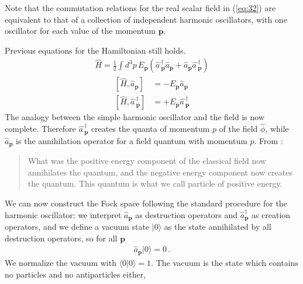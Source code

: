 Note that the commutation relations for the real scalar field in (\ref{eq:32}) are equivalent to that of a collection of independent harmonic oscillators, with one oscillator for each value of the momentum $\mathbf{p}$.

Previous equations for the Hamiltonian still holds. 
\begin{align}
  \widehat{H}=\frac{1}{2}\int d^3p\,E_{\mathbf{p}}\left(\widehat{a\,}_{\mathbf{p}}^\dagger\widehat{a}_{\mathbf{p}}
+\widehat{a}_{\mathbf{p}}\widehat{a\,}_{\mathbf{p}}^\dagger\right)
\end{align}
\begin{align}
  \left[\widehat{H},\widehat{a}_{\mathbf{p}}\right]&=-E_{\mathbf{p}}\widehat{a}_{\mathbf{p}}\nonumber\\
  \left[\widehat{H},\widehat{a\,}_{\mathbf{p}}^\dagger \right]&=+E_{\mathbf{p}}\widehat{a\,}_{\mathbf{p}}^\dagger
\end{align}
The analogy between the simple harmonic oscillator and the field is now complete. Therefore $\widehat{a\,}_{\mathbf{p}}^\dagger$ creates the quanta of momentum $p$ of the field $\widehat{\phi}$, while $\widehat{a}_{\mathbf{p}}$ is the annihilation operator for a field quantum with momentum $p$. From \cite{Lahiri:2005sm}:
\begin{quote}
  What was the positive energy component of the classical field now annihilates the quantum, and the negative energy component now creates the quantum. This quantum is what we call particle of positive energy.
\end{quote}


We can now construct the Fock space following the standard procedure
for the harmonic oscillator: we interpret $\widehat{a}_\mathbf{p}$ as destruction operators and $\widehat{a}_\mathbf{p}^\dagger$
as creation operators, and we define a vacuum state $|0\rangle$ as the state
annihilated by all destruction operators, so for all $\mathbf{p}$
\begin{align}
  \widehat{a}_\mathbf{p}|0\rangle=0\,.
\end{align}
We normalize the vacuum with $\langle0|0\rangle=1$. The vacuum is the state which contains no particles and no antiparticles either,

